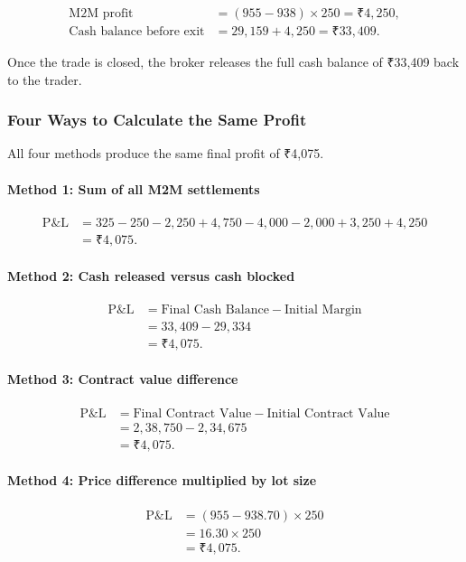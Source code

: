 \documentclass[12pt,openany]{book}
\begin{document}
\begin{align*}
\text{M2M profit} &= (955 - 938) \times 250 = \text{₹}4{,}250, \\
\text{Cash balance before exit} &= 29{,}159 + 4{,}250 = \text{₹}33{,}409.
\end{align*}

Once the trade is closed, the broker releases the full cash balance of ₹33,409 back to the trader.

\subsubsection{Four Ways to Calculate the Same Profit}
All four methods produce the same final profit of ₹4,075.

\paragraph{Method 1: Sum of all M2M settlements}
\begin{align*}
\text{P\&L} &= 325 - 250 - 2{,}250 + 4{,}750 - 4{,}000 - 2{,}000 + 3{,}250 + 4{,}250 \\
&= \text{₹}4{,}075.
\end{align*}

\paragraph{Method 2: Cash released versus cash blocked}
\begin{align*}
\text{P\&L} &= \text{Final Cash Balance} - \text{Initial Margin} \\
&= 33{,}409 - 29{,}334 \\
&= \text{₹}4{,}075.
\end{align*}

\paragraph{Method 3: Contract value difference}
\begin{align*}
\text{P\&L} &= \text{Final Contract Value} - \text{Initial Contract Value} \\
&= 2{,}38{,}750 - 2{,}34{,}675 \\
&= \text{₹}4{,}075.
\end{align*}

\paragraph{Method 4: Price difference multiplied by lot size}
\begin{align*}
\text{P\&L} &= (955 - 938.70) \times 250 \\
&= 16.30 \times 250 \\
&= \text{₹}4{,}075.
\end{align*}
\end{document}
